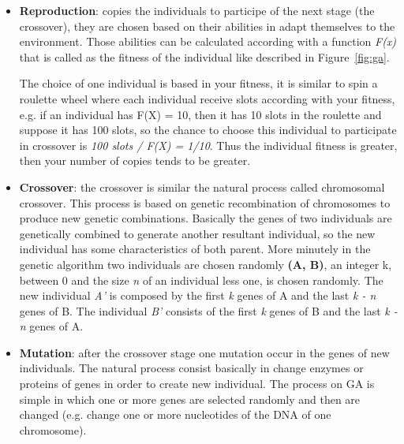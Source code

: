\begin{itemize}
	\item \textbf{Reproduction}: copies the individuals to participe of the next
	stage (the crossover), they are chosen based on their abilities in adapt themselves
	to the environment. Those abilities can be calculated according with a function
	\textit{F(x)} that is called as the fitness of the individual like described
	in Figure~\ref{fig:ga}.

    The choice of one individual is based in your fitness, it is similar to spin
    a roulette wheel where each individual receive slots according
    with your fitness, e.g. if an individual has F(X) = 10, then it has 10 slots
    in the roulette and suppose it has 100 slots, so the chance to choose this individual
    to participate in crossover is {\it100 slots / F(X) = 1/10}. Thus the individual
    fitness is greater, then your number of copies tends to be greater.

	\item \textbf{Crossover}: the crossover is similar the natural process called
	chromosomal crossover. This process is based on genetic recombination of
	chromosomes	to produce new genetic combinations. Basically the genes of two
    individuals are genetically combined to generate another resultant individual,
    so the new individual has some characteristics of both parent.
	More minutely in the genetic algorithm two individuals are chosen randomly {\bf(A, B)},
	an integer k, between 0 and the size {\it n} of an individual less one, is chosen
	randomly. The new individual {\it A'} is composed by the first {\it k} genes of A
	and the last {\it k - n} genes of B. The individual {\it B'} consists of the
	first {\it k} genes of B and the last {\it k - n} genes of A. 

	\item \textbf{Mutation}: after the crossover stage one mutation occur in the
	genes of new individuals. The natural process consist basically in change enzymes
    or proteins of genes in order to create new individual. The process on GA is
    simple in which one or more genes are selected randomly and then are changed
    (e.g. change one or more nucleotides of the DNA	of one chromosome).

\end{itemize}

